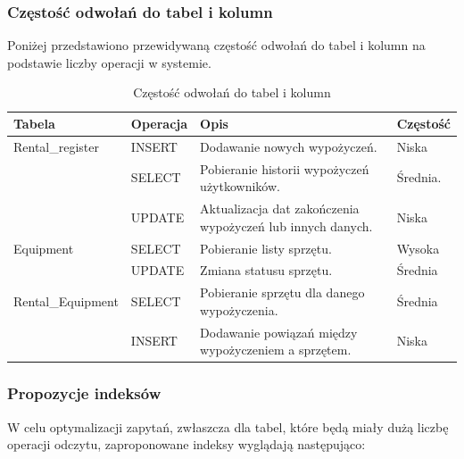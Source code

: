 \documentclass{article}
\begin{document}
\subsubsection{\textbf{Częstość odwołań do tabel i kolumn}}
Poniżej przedstawiono przewidywaną częstość odwołań do tabel i kolumn na podstawie liczby operacji w systemie.

\begin{table}[h]
    \centering
        \begin{tabular}[width=\textwidth]{|l|l|p{5cm}|l|}
            \hline
            \textbf{Tabela} & \textbf{Operacja} & \textbf{Opis} & \textbf{Częstość} \\ \hline
            Rental\_register& INSERT  & Dodawanie nowych wypożyczeń. & Niska  \\ \hline
             ~ & SELECT & Pobieranie historii wypożyczeń użytkowników. & Średnia. \\ \hline
             ~ & UPDATE & Aktualizacja dat zakończenia wypożyczeń lub innych danych. & Niska \\ \hline
            Equipment & SELECT & Pobieranie listy sprzętu. & Wysoka  \\ \hline
              & UPDATE & Zmiana statusu sprzętu. & Średnia \\ \hline
            Rental\_Equipment & SELECT & Pobieranie sprzętu dla danego wypożyczenia. & Średnia \\ \hline
              & INSERT & Dodawanie powiązań między wypożyczeniem a sprzętem. & Niska \\ \hline
        \end{tabular}
    \caption{Częstość odwołań do tabel i kolumn}
\end{table}

\subsubsection{Propozycje indeksów}
W celu optymalizacji zapytań, zwłaszcza dla tabel, które będą miały dużą liczbę operacji odczytu, zaproponowane indeksy wyglądają następująco:
\end{document}
